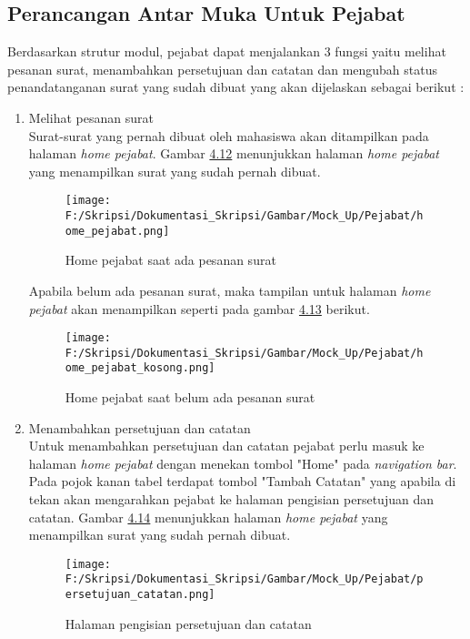 \subsection{Perancangan Antar Muka Untuk Pejabat}
\label{sec:perancangan_antar_muka_pejabat}
Berdasarkan strutur modul, pejabat dapat menjalankan 3 fungsi yaitu melihat pesanan surat, menambahkan persetujuan dan catatan dan mengubah status penandatanganan surat yang sudah dibuat yang akan dijelaskan sebagai berikut :
\begin{enumerate}
	\item Melihat pesanan surat\\
	Surat-surat yang pernah dibuat oleh mahasiswa akan ditampilkan pada halaman \textit{home pejabat}. Gambar \hyperlink{home_pejabat_saat_ada_pesanan_surat}{4.12} menunjukkan halaman \textit{home pejabat} yang menampilkan surat yang sudah pernah dibuat.
	\begin{figure}[H]
	\centering
		\texttt{[image: F:/Skripsi/Dokumentasi\_Skripsi/Gambar/Mock\_Up/Pejabat/home\_pejabat.png]}
		\caption{Home pejabat saat ada pesanan surat}
		\label{fig:home_pejabat_saat_ada_pesanan_surat}
	\end{figure}
	
	Apabila belum ada pesanan surat, maka tampilan untuk halaman \textit{home pejabat} akan menampilkan seperti pada gambar \hyperlink{home_pejabat_saat_belum_ada_pesanan_surat}{4.13} berikut. 
	\begin{figure}[H]
	\centering
		\texttt{[image: F:/Skripsi/Dokumentasi\_Skripsi/Gambar/Mock\_Up/Pejabat/home\_pejabat\_kosong.png]}
		\caption{Home pejabat saat belum ada pesanan surat}
		\label{fig:home_pejabat_saat_belum_ada_pesanan_surat}
	\end{figure}
	
	\item Menambahkan persetujuan dan catatan\\
	Untuk menambahkan persetujuan dan catatan pejabat perlu masuk ke halaman \textit{home pejabat} dengan menekan tombol "Home" pada \textit{navigation bar}. Pada pojok kanan tabel terdapat tombol "Tambah Catatan" yang apabila di tekan akan mengarahkan pejabat ke halaman pengisian persetujuan dan catatan. Gambar \hyperlink{halaman_pengisian_persetujuan_dan_catatan}{4.14} menunjukkan halaman \textit{home pejabat} yang menampilkan surat yang sudah pernah dibuat.
	\begin{figure}[H]
	\centering
		\texttt{[image: F:/Skripsi/Dokumentasi\_Skripsi/Gambar/Mock\_Up/Pejabat/persetujuan\_catatan.png]}
		\caption{Halaman pengisian persetujuan dan catatan}
		\label{fig:halaman_pengisian_persetujuan_dan_catatan}
	\end{figure}
	

\end{enumerate}
